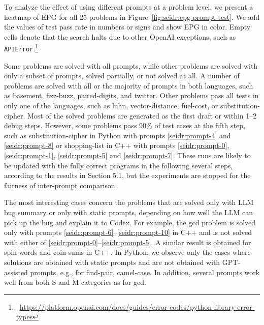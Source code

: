 To analyze the effect of using different prompts at a problem level, we present a heatmap of EPG for all 25 problems in Figure~\ref{fig:seidr:epg-prompt-test}. 
We add the values of test pass rate in numbers or signs and show EPG in color. 
Empty cells denote that the search halts due to other OpenAI exceptions, such as \texttt{APIError}.\footnote{~\url{https://platform.openai.com/docs/guides/error-codes/python-library-error-types}}

Some problems are solved with all prompts, while other problems are solved with only a subset of prompts, solved partially, or not solved at all. 
A number of problems are solved with all or the majority of prompts in both languages, such as basement, fizz-buzz, paired-digits, and twitter.
Other problems pass all tests in only one of the languages, such as luhn, vector-distance, fuel-cost, or substitution-cipher. 
Most of the solved problems are generated as the first draft or within 1--2 debug steps. 
However, some problems pass 90\% of test cases at the fifth step, such as substitution-cipher in Python with prompts \ref{seidr:prompt-4} and \ref{seidr:prompt-8} or shopping-list in C++ with prompts \ref{seidr:prompt-0}, \ref{seidr:prompt-1}, \ref{seidr:prompt-5} and \ref{seidr:prompt-7}. 
These runs are likely to be updated with the fully correct programs in the following several steps, according to the results in Section 5.1, but the experiments
are stopped for the fairness of inter-prompt comparison.

The most interesting cases concern the problems that are solved only with LLM bug summary or only with static prompts, depending on how well the LLM can pick up the bug and explain it to Codex. 
For example, the gcd problem is solved only with prompts \ref{seidr:prompt-6}--\ref{seidr:prompt-10} in C++ and is not solved with either of \ref{seidr:prompt-0}--\ref{seidr:prompt-5}. 
A similar result is obtained for spin-words and coin-sums in C++.
In Python, we observe only the cases where solutions are obtained with static prompts and are not obtained with GPT-assisted prompts, e.g., for find-pair, camel-case. In addition, several prompts work well from both S and M categories as for gcd. 


